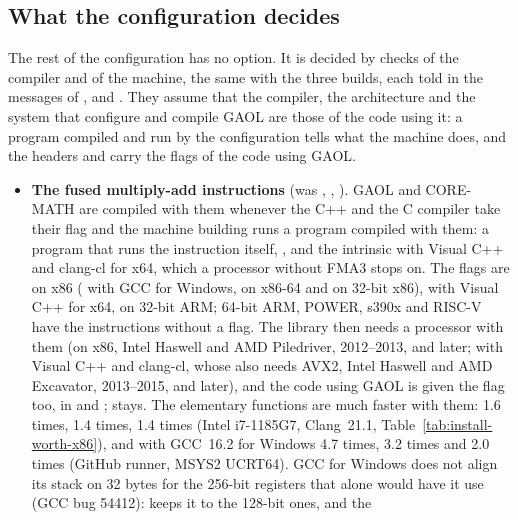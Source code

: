 \subsection{What the configuration decides}\label{sec:install-decides}

The rest of the configuration has no option. It is decided by checks of the
compiler and of the machine, the same with the three builds, each told in the
messages of ,  and . They assume
that the compiler, the architecture and the system that configure and compile
GAOL are those of the code using it: a program compiled and run by the
configuration tells what the machine does, and the headers and 
carry the flags of the code using GAOL.\newinvfive

\begin{itemize}
\item[$\bullet$] \textbf{The fused multiply-add instructions} (was
  , , ). GAOL and
  CORE-MATH are compiled with them whenever the C++ and the C compiler take
  their flag and the machine building runs a program compiled with them: a
  program that runs the instruction itself, , and
  the intrinsic  with Visual C++ and clang-cl for
  x64, which a processor without FMA3 stops on. The flags are
   on x86 ( with GCC
  for Windows, on x86-64 and on 32-bit x86),  with Visual
  C++ for x64,  on 32-bit ARM;
  64-bit ARM, POWER, s390x and RISC-V have the instructions without a flag.
  The library then needs a processor with them (on x86, Intel Haswell and AMD
  Piledriver, 2012--2013, and later; with Visual C++ and clang-cl, whose 
  also needs AVX2, Intel Haswell and AMD Excavator, 2013--2015, and later), and the code using GAOL is given the
  flag too, in  and ; 
  stays. The elementary functions are much faster with them:  1.6 times,
   1.4 times,  1.4 times (Intel i7-1185G7, Clang~21.1,
  Table~\ref{tab:install-worth-x86}), and with GCC~16.2 for Windows 
  4.7 times,  3.2 times and  2.0 times (GitHub runner,
  MSYS2 UCRT64). GCC for
  Windows does not align its stack on 32 bytes for the 256-bit registers that
   alone would have it use (GCC bug 54412):
   keeps it to the 128-bit ones, and the

\end{itemize}
